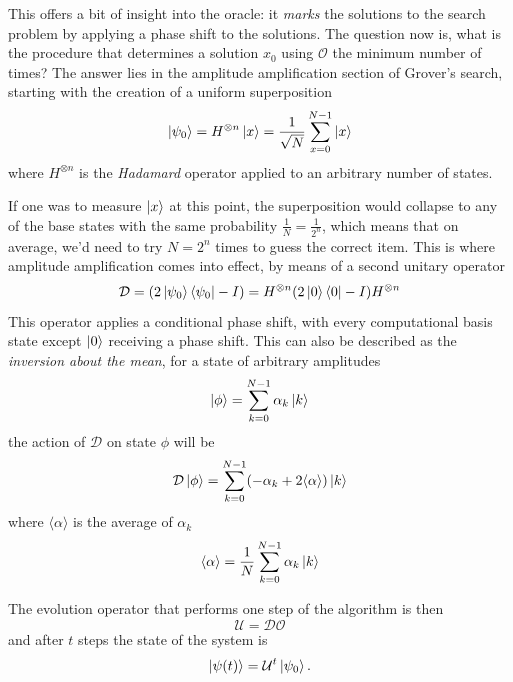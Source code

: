 \documentclass[../../dissertation.tex]{subfiles}
\begin{document}
This offers a bit of insight into the oracle: it \textit{marks} the solutions
to the search problem by applying a phase shift to the solutions. 
The question now is, what is the procedure that determines a solution $x_0$
using $\mathcal{O}$ the minimum number of times? The answer lies in the
amplitude amplification section of Grover's search, starting with the creation
of a uniform superposition
\begin{equation}
	\ket{\psi_0} = H^{\otimes n}\ket{x} = \frac{1}{\sqrt{N}}\sum_{x=0}^{N-1} \ket{x}
\end{equation}
where $H^{\otimes n}$ is the \textit{Hadamard} operator applied to an arbitrary
number of states.\par

If one was to measure $\ket{x}$ at this point, the superposition would collapse
to any of the base states with the same probability $\frac{1}{N} =
\frac{1}{2^n}$, which means that on average, we'd need to try $N = 2^n$ times
to guess the correct item.  This is where amplitude amplification comes into
effect, by means of a second unitary operator
\begin{equation}
	\mathcal{D} = (2\ket{\psi_0}\bra{\psi_0} - I) = H^{\otimes n}(2\ket{0}\bra{0} - I)H^{\otimes n}   
\end{equation}
This operator applies a conditional phase shift, with every computational basis
state except $\ket{0}$ receiving a phase shift. This can also be described as
the \textit{inversion about the mean}, for a state of arbitrary amplitudes
\begin{equation}
	\ket{\phi} = \sum_{k=0}^{N-1} \alpha_k\ket{k}
\end{equation}
the action of $\mathcal{D}$ on state $\phi$ will be
\begin{equation}
	\mathcal{D}\ket{\phi} = \sum_{k=0}^{N-1}(-\alpha_k + 2\langle \alpha \rangle)\ket{k}
\end{equation}
where $\langle \alpha \rangle$ is the average of $\alpha_k$
\begin{equation}
	\langle \alpha \rangle = \frac{1}{N} \sum_{k=0}^{N-1} \alpha_k\ket{k}
\end{equation}
\par
The evolution operator that performs one step of the algorithm is then
\begin{equation}
	\mathcal{U} = \mathcal{D}\mathcal{O}
\end{equation}
and after $t$ steps the state of the system is
\begin{equation}
	\ket{\psi(t)} = \mathcal{U}^t\ket{\psi_0}.
	\label{eq:groverFinalState}
\end{equation}
\end{document}
